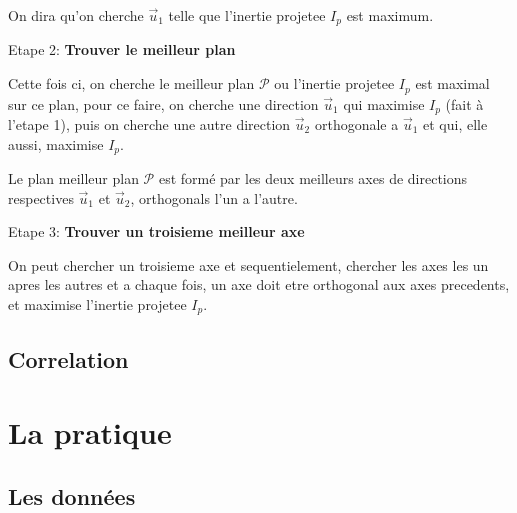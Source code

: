 \documentclass{article}
\begin{document}
On dira qu’on cherche $\vec{u}_1$ telle que l’inertie projetee $I_p$ est maximum.

\begin{flushleft}
Etape 2: \textbf{Trouver le meilleur plan}
\end{flushleft}

Cette fois ci, on cherche le meilleur plan $\mathcal{P}$ ou l'inertie projetee $I_p$ est maximal sur ce plan, pour ce faire, on cherche une direction $\vec{u}_1$ qui maximise $I_p$ (fait à l'etape 1), puis on cherche une autre direction $\vec{u}_2$ orthogonale a $\vec{u}_1$ et qui, elle aussi, maximise $I_p$.
\newline

Le plan meilleur plan $\mathcal{P}$ est formé par les deux meilleurs axes de directions respectives $\vec{u}_1$ et $\vec{u}_2$, orthogonals l'un a l'autre.

\begin{flushleft}
Etape 3: \textbf{Trouver un troisieme meilleur axe}
\end{flushleft}

On peut chercher un troisieme axe et sequentielement, chercher les axes les un apres les autres et a chaque fois, un axe doit etre orthogonal aux axes precedents, et maximise l'inertie projetee $I_p$.

\newpage

\subsection{Correlation}


\newpage

\section{La pratique}

\subsection{Les données}
\end{document}
